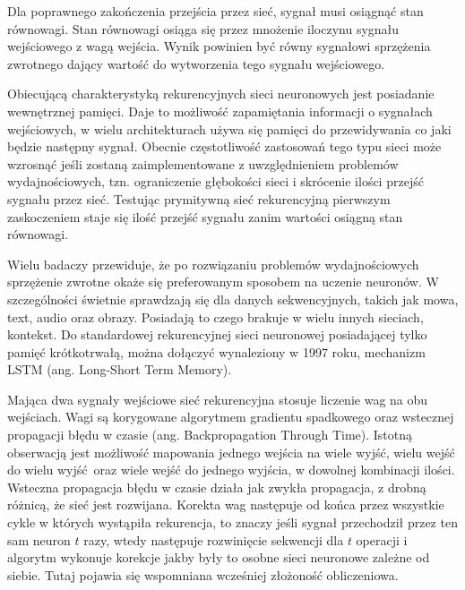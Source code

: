 \documentclass[12pt,a4paper,twoside,titlepage,openright]{book}
\begin{document}
Dla poprawnego zakończenia przejścia przez sieć, sygnał musi osiągnąć stan równowagi. Stan równowagi osiąga się przez mnożenie iloczynu sygnału wejściowego z wagą wejścia. Wynik powinien być równy sygnałowi sprzężenia zwrotnego dający wartość do wytworzenia tego sygnału wejściowego.

Obiecującą charakterystyką rekurencyjnych sieci neuronowych jest posiadanie wewnętrznej pamięci. Daje to możliwość zapamiętania informacji o sygnałach wejściowych, w wielu architekturach używa się pamięci do przewidywania co jaki będzie następny sygnał. Obecnie częstotliwość zastosowań tego typu sieci może wzrosnąć jeśli zostaną zaimplementowane z uwzględnieniem problemów wydajnościowych, tzn. ograniczenie głębokości sieci i skrócenie ilości przejść sygnału przez sieć. Testując prymitywną sieć rekurencyjną pierwszym zaskoczeniem staje się ilość przejść sygnału zanim wartości osiągną stan równowagi.

Wielu badaczy \cite{siteRNN} przewiduje,  że po rozwiązaniu problemów wydajnościowych sprzężenie zwrotne okaże się preferowanym sposobem na uczenie neuronów. W szczególności świetnie sprawdzają się dla danych sekwencyjnych, takich jak mowa, text, audio oraz obrazy. Posiadają to czego brakuje w wielu innych sieciach, kontekst. Do standardowej rekurencyjnej sieci neuronowej posiadającej tylko pamięć krótkotrwałą, można dołączyć wynaleziony w 1997 roku, mechanizm LSTM (ang. Long-Short Term Memory). 

Mająca dwa sygnały wejściowe sieć rekurencyjna stosuje liczenie wag na obu wejściach. Wagi są korygowane algorytmem gradientu spadkowego oraz wstecznej propagacji błędu w czasie (ang. Backpropagation Through Time). Istotną obserwacją jest możliwość mapowania jednego wejścia na wiele wyjść, wielu wejść do wielu wyjść oraz wiele wejść do jednego wyjścia, w dowolnej kombinacji ilości. Wsteczna propagacja błędu w czasie działa jak zwykła propagacja, z drobną różnicą, że sieć jest rozwijana. Korekta wag następuje od końca przez wszystkie cykle w których wystąpiła rekurencja, to znaczy jeśli sygnał przechodził przez ten sam neuron $t$ razy, wtedy następuje rozwinięcie sekwencji dla $t$ operacji i algorytm wykonuje korekcje jakby były to osobne sieci neuronowe zależne od siebie. Tutaj pojawia się wspomniana wcześniej złożoność obliczeniowa.
\end{document}
